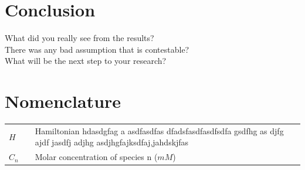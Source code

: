 \documentclass[10pt,a4paper,twoside]{article}
\begin{document}
\section{Conclusion}

 What did you really see from the results?\\
 There was any bad assumption that is contestable?\\
 What will be the next step to your research? \\
 
\section{Nomenclature} 
   \begin{tabulary}{1.0\textwidth}{LCL}
   $H$ &   & Hamiltonian hdasdgfag \cite{magic}a asdfasdfas dfadsfasdfasdfsdfa gsdfhg as djfg ajdf jasdfj adjhg asdjhgfajksdfaj,jahdskjfas\\
   $C_n$ &   & Molar concentration of species n ($mM$) \\
   \end{tabulary}


\vfill
\newpage
\end{document}
